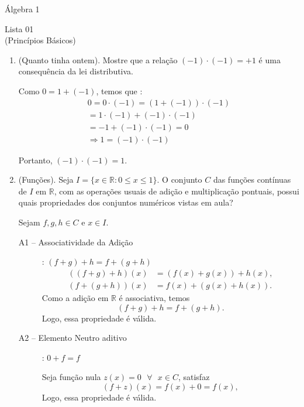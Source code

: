 \documentclass[a4paper,12pt]{article}
\begin{document}
\begin{center}
    Álgebra 1 
\end{center}

\begin{center}
    \large Lista 01 \\
    \small (Princípios Básicos)
\end{center}

  \begin{enumerate}[label=1.\arabic*.]

    \item (Quanto tinha ontem). Mostre que a relação $(-1)\cdot(-1)=+1$ é uma consequência 
    da lei distributiva.

    Como $0=1+(-1)$, temos que :
    \begin{gather*}
      0 = 0\cdot(-1) = (1+(-1))\cdot(-1) \\
      = 1\cdot(-1) + (-1)\cdot(-1) \\
      = -1 + (-1)\cdot(-1) = 0 \\
      \Rightarrow 1 = (-1)\cdot(-1)
    \end{gather*}

    Portanto, $(-1)\cdot(-1)=1$.

    \item (Funções). Seja $I=\{x\in\mathbb{R}:0\le x\le 1\}$. O conjunto $C$ das funções 
    contínuas de $I$ em $\mathbb{R}$, com as operações usuais de adição e multiplicação 
    pontuais, possui quais propriedades dos conjuntos numéricos vistas em aula?

    Sejam $f,g,h \in C$ e $x \in I$.

    \begin{description}
      \item[A1 -- Associatividade da Adição] : $(f+g)+h = f+(g+h)$  
      \begin{align*}
        ((f+g)+h)(x) &= (f(x)+g(x)) + h(x), \\
        (f+(g+h))(x) &= f(x) + (g(x)+h(x)).
      \end{align*}
      Como a adição em $\mathbb{R}$ é associativa, temos
      \[
      (f+g)+h = f+(g+h).
      \]
      Logo, essa propriedade é válida.

      \item[A2 -- Elemento Neutro aditivo] : $0 + f = f$  
      
      Seja função nula $z(x) = 0 \text{ } \forall \text{ } x \in C$, satisfaz
      \[
      (f+z)(x) = f(x) + 0 = f(x),
      \]
      Logo, essa propriedade é válida. 


\end{description}
\end{enumerate}
\end{document}
